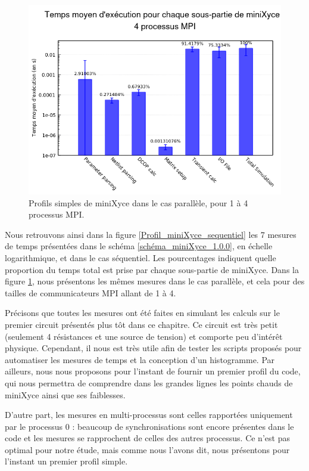 \documentclass[11pt,a4paper,oneside]{memoir}
\theoremstyle{definition}
\theoremstyle{remark}
\theoremstyle{plain}
\begin{document}
\begin{figure}
\begin{center}
\includegraphics[scale=0.45]{Images-Rapport/Profil_miniXyce/Profil_miniXyce_parallele4.png}
\caption{Profils simples de miniXyce dans le cas parallèle, pour 1 à 4 processus MPI.}
\label{Profil_miniXyce_parallele}
\end{center}
\end{figure}

Nous retrouvons ainsi dans la figure \ref{Profil_miniXyce_sequentiel} les 7 mesures de temps présentées dans le schéma \ref{schéma_miniXyce_1.0.0}, en échelle logarithmique, et dans le cas séquentiel. Les pourcentages indiquent quelle proportion du temps total est prise par chaque sous-partie de miniXyce. Dans la figure \ref{Profil_miniXyce_parallele}, nous présentons les mêmes mesures dans le cas parallèle, et cela pour des tailles de communicateurs MPI allant de 1 à 4.

Précisons que toutes les mesures ont été faites en simulant les calculs sur le premier circuit présentés plus tôt dans ce chapitre. Ce circuit est très petit (seulement 4 résistances et une source de tension) et comporte peu d'intérêt physique. Cependant, il nous est très utile afin de tester les scripts proposés pour automatiser les mesures de temps et la conception d'un histogramme. Par ailleurs, nous nous proposons pour l'instant de fournir un premier profil du code, qui nous permettra de comprendre dans les grandes lignes les points chauds de miniXyce ainsi que ses faiblesses.

D'autre part, les mesures en multi-processus sont celles rapportées uniquement par le processus 0 : beaucoup de synchronisations sont encore présentes dans le code et les mesures se rapprochent de celles des autres processus. Ce n'est pas optimal pour notre étude, mais comme nous l'avons dit, nous présentons pour l'instant un premier profil simple.
\end{document}
